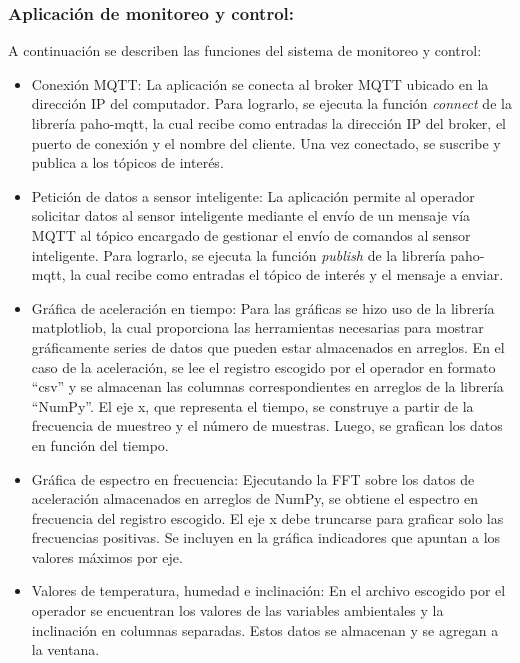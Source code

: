 \subsubsection{Aplicación de monitoreo y control:}

A continuación se describen las funciones del sistema de monitoreo y control:

\begin{itemize}
    
    \item Conexión MQTT: La aplicación se conecta al broker MQTT ubicado en la dirección IP del computador. Para lograrlo, se ejecuta la función \textit{connect} de la librería paho-mqtt, la cual recibe como entradas la dirección IP del broker, el puerto de conexión y el nombre del cliente. Una vez conectado, se suscribe y publica a los tópicos de interés.
    
    \item Petición de datos a sensor inteligente: La aplicación permite al operador solicitar datos al sensor inteligente mediante el envío de un mensaje vía MQTT al tópico encargado de gestionar el envío de comandos al sensor inteligente. Para lograrlo, se ejecuta la función \textit{publish} de la librería paho-mqtt, la cual recibe como entradas el tópico de interés y el mensaje a enviar.
    
        
    \item Gráfica de aceleración en tiempo: Para las gráficas se hizo uso de la librería matplotliob, la cual proporciona las herramientas necesarias para mostrar gráficamente series de datos que pueden estar almacenados en arreglos. En el caso de la aceleración, se lee el registro escogido por el operador en formato ``csv'' y se almacenan las columnas correspondientes en arreglos de la librería ``NumPy''. El eje x, que representa el tiempo, se construye a partir de la frecuencia de muestreo y el número de muestras. Luego, se grafican los datos en función del tiempo.
    
    \item Gráfica de espectro en frecuencia: Ejecutando la FFT sobre los datos de aceleración almacenados en arreglos de NumPy, se obtiene el espectro en frecuencia del registro escogido. El eje x debe truncarse para graficar solo las frecuencias positivas. Se incluyen en la gráfica indicadores que apuntan a los valores máximos por eje.
    
    \item Valores de temperatura, humedad e inclinación: En el archivo escogido por el operador se encuentran los valores de las variables ambientales y la inclinación en columnas separadas. Estos datos se almacenan y se agregan a la ventana. 
    

\end{itemize}
